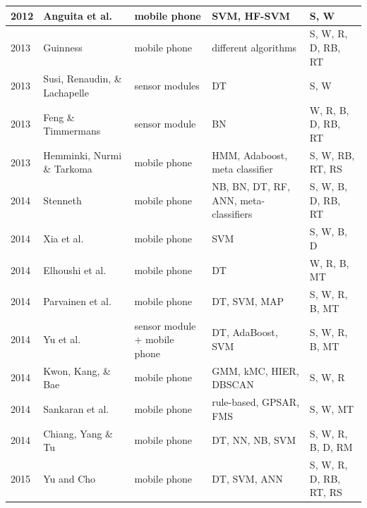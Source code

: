 \begin{center}
\begin{longtable} {|l|>{\raggedright}p{3cm}|p{2.4cm}|>{\centering\arraybackslash}p{2.5cm}|>{\centering\arraybackslash}p{2.2cm}|}
2012 & Anguita et al. \cite{anguita2012human} & mobile phone & SVM, HF-SVM & S, W \\ \hline
2013 & Guinness \cite{Guinness2013}& mobile phone & 20 different algorithms & S, W, R, D, RB, RT\\ \hline
2013 & Susi, Renaudin, \& Lachapelle \cite{susi2013motion}& sensor modules & DT & S, W \\ \hline
2013 & Feng \& Timmermans \cite{feng2013transportation}& sensor module  & BN & W, R, B, D, RB, RT \\ \hline
2013 & Hemminki, Nurmi \& Tarkoma \cite{hemminki2013accelerometer}& mobile phone & HMM, Adaboost, meta classifier & S, W, RB, RT, RS \\ \hline
2014 & Stenneth \cite{stenneth2014detecting} & mobile phone & NB, BN, DT, RF, ANN, meta-classifiers & S, W, B, D, RB, RT\\ \hline
2014 & Xia et al. \cite{xia2014using}& mobile phone & SVM & S, W, B, D\\ \hline
2014 & Elhoushi et al. \cite{elhoushi2014robust}& mobile phone & DT & W, R, B, MT \\ \hline
2014 & Parvainen et al. \cite{parviainen2014adaptive} & mobile phone & DT, SVM, MAP & S, W, R, B, MT \\ \hline
2014 & Yu et al. \cite{yu2014big} & sensor module + mobile phone & DT, AdaBoost, SVM & S, W, R, B, MT \\ \hline
2014 & Kwon, Kang, \& Bae \cite{kwon2014unsupervised} & mobile phone & GMM, kMC, HIER, DBSCAN & S, W, R \\ \hline
2014 & Sankaran et al. \cite{sankaran2014using} & mobile phone & rule-based, GPSAR, FMS & S, W, MT \\ \hline
2014 & Chiang, Yang \& Tu \cite{chiang2014pattern} & mobile phone & DT, NN, NB, SVM & S, W, R, B, D, RM \\ \hline 
2015 & Yu and Cho \cite{yu2015low} & mobile phone & DT, SVM, ANN & S, W, R, D, RB, RT, RS \\ \hline
\end{longtable}
\end{center}





